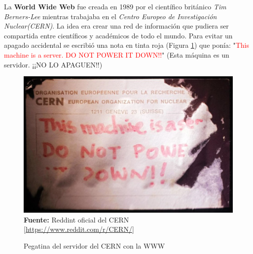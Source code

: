 \label{txt:web3}
La \textbf{World Wide Web} fue creada en 1989 por el científico británico 
\textit{Tim Berners-Lee} mientras trabajaba en el \textit{Centro Europeo de Investigación 
Nuclear(CERN)}. La idea era crear una red de información que pudiera ser compartida 
entre científicos y académicos de todo el mundo. Para evitar un apagado accidental se escribió 
una nota en tinta roja (Figura \ref*{fig:cern-server}) que ponía: "\textcolor{red}{This machine is a server. DO NOT 
POWER IT DOWN!!}"\cite{cernWeb1} (Esta máquina es un servidor. ¡¡NO LO APAGUEN!!) \\
\begin{figure}[htb!]
    \caption{Pegatina del servidor del CERN con la WWW}
    \label{fig:cern-server}
    \centering
    \includegraphics[scale=0.25]{./Ilustraciones/cern-server.jpg}\\
    \textbf{Fuente:} Reddint oficial del CERN [\url{https://www.reddit.com/r/CERN/}]
\end{figure}


